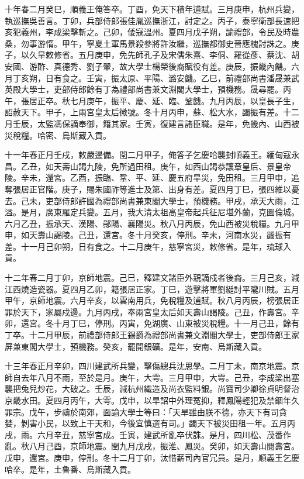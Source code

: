 \begin{pinyinscope}
十年春二月癸巳，順義王俺答卒。丁酉，免天下積年逋賦。三月庚申，杭州兵變，執巡撫吳善言。丁卯，兵部侍郎張佳胤巡撫浙江，討定之。丙子，泰寧衛部長速把亥犯義州，李成梁擊斬之。己卯，倭寇溫州。夏四月戊子朔，諭禮部，令民及時農桑，勿事游惰。甲午，寧夏土軍馬景殺參將許汝繼，巡撫都御史晉應槐討誅之。庚子，以久旱敕修省。五月庚申，免先師孔子及宋儒朱熹、李侗、羅從彥、蔡沈、胡安國、游酢、真德秀、劉子翬，故大學士楊榮後裔賦役有差。庚辰，振畿內饑。六月丁亥朔，日有食之。壬寅，振太原、平陽、潞安饑。乙巳，前禮部尚書潘晟兼武英殿大學士，吏部侍郎餘有丁為禮部尚書兼文淵閣大學士，預機務。晟尋罷。丙午，張居正卒。秋七月庚午，振平、慶、延、臨、鞏饑。九月丙辰，以皇長子生，詔赦天下。甲子，上兩宮皇太后徽號。冬十月丙申，蘇、松大水，蠲振有差。十二月壬辰，太監馮保謫奉御，籍其家。壬寅，復建言諸臣職。是年，免畿內、山西被災稅糧。哈密、烏斯藏入貢。

十一年春正月壬戌，敕嚴邊備。閏二月甲子，俺答子乞慶哈襲封順義王。緬甸寇永昌。乙丑，如天壽山謁九陵，免所過田租。庚午，如西山謁恭讓章皇后、景皇帝陵。辛未，還宮。乙酉，振臨、鞏、平、延、慶五府旱災，免田租。三月甲申，追奪張居正官階。庚子，賜朱國祚等進士及第、出身有差。夏四月丁巳，張四維以憂去。己未，吏部侍郎許國為禮部尚書兼東閣大學士，預機務。甲戌，承天大雨，江溢。是月，廣東羅定兵變。五月，我大清太祖高皇帝起兵征尼堪外蘭，克圖倫城。六月乙丑，振承天、漢陽、鄖陽、襄陽災。秋八月丙辰，免山西被災稅糧。九月甲申，如天壽山謁陵。己丑，還宮。冬十月癸亥，停刑。辛未，河南水災，蠲振有差。十一月己卯朔，日有食之。十二月庚午，慈寧宮災，敕修省。是年，琉球入貢。

十二年春二月丁卯，京師地震。己巳，釋建文諸臣外親謫戍者後裔。三月己亥，減江西燒造瓷器。夏四月乙卯，籍張居正家。丁巳，遊擊將軍劉綎討平隴川賊。五月甲午，京師地震。六月辛亥，以雲南用兵，免稅糧及逋賦。秋八月丙辰，榜張居正罪於天下，家屬戍邊。九月丙戌，奉兩宮皇太后如天壽山謁陵。己丑，作壽宮。辛卯，還宮。冬十月丁巳，停刑。丙寅，免湖廣、山東被災稅糧。十一月己丑，餘有丁卒。十二月甲辰，前禮部侍郎王錫爵為禮部尚書兼文淵閣大學士，吏部侍郎王家屏兼東閣大學士，預機務。癸亥，罷開銀礦。是年，安南、烏斯藏入貢。

十三年春正月辛卯，四川建武所兵變，擊傷總兵沈思學。二月丁未，南京地震。京師自去年八月不雨，至於是月。庚午，大雩。三月甲申，大雩。己丑，李成梁出塞襲把兔兒炒花，大破之。壬辰，減杭州織造及尚衣監料銀。尚寶司少卿徐貞明督治京畿水田。夏四月丙午，大雩。戊申，以旱詔中外理冤抑，釋鳳陽輕犯及禁錮年久罪宗。戊午，步禱於南郊，面諭大學士等曰：「天旱雖由朕不德，亦天下有司貪婪，剝害小民，以致上干天和，今後宜慎選有司。」蠲天下被災田租一年。五月丙戌，雨。六月辛丑，慈寧宮成。壬寅，建武所亂卒伏誅。是月，四川松、茂番作亂。秋八月己酉，京師地震。閏九月戊戌，振淮、鳳災。癸卯，如天壽山閱壽宮。戊申，還宮。庚申，停刑。冬十二月丁卯，汰惜薪司內官冗員。是月，順義王乞慶哈卒。是年，土魯番、烏斯藏入貢。


\end{pinyinscope}
